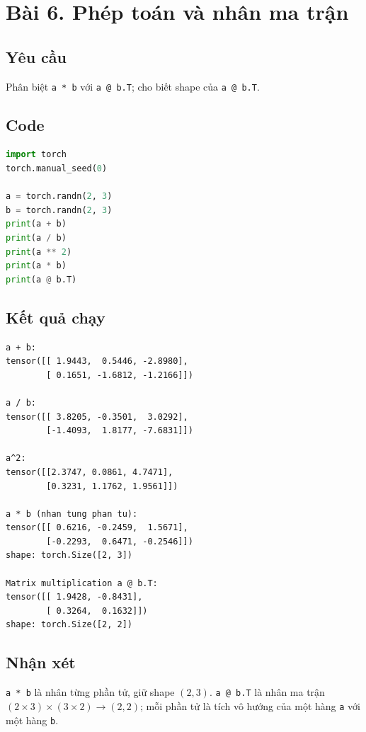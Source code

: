 \documentclass[a4paper,13pt]{article}
\begin{document}
\newpage
\section{Bài 6. Phép toán và nhân ma trận}

\subsection{Yêu cầu}
Phân biệt \texttt{a * b} với \texttt{a @ b.T}; cho biết shape của \texttt{a @ b.T}.

\subsection{Code}
\begin{lstlisting}[language=Python]
import torch
torch.manual_seed(0)

a = torch.randn(2, 3)
b = torch.randn(2, 3)
print(a + b)
print(a / b)
print(a ** 2)
print(a * b)
print(a @ b.T)
\end{lstlisting}

\subsection{Kết quả chạy}
\begin{lstlisting}[backgroundcolor=\color{outgray}]
a + b:
tensor([[ 1.9443,  0.5446, -2.8980],
        [ 0.1651, -1.6812, -1.2166]])

a / b:
tensor([[ 3.8205, -0.3501,  3.0292],
        [-1.4093,  1.8177, -7.6831]])

a^2:
tensor([[2.3747, 0.0861, 4.7471],
        [0.3231, 1.1762, 1.9561]])

a * b (nhan tung phan tu):
tensor([[ 0.6216, -0.2459,  1.5671],
        [-0.2293,  0.6471, -0.2546]])
shape: torch.Size([2, 3])

Matrix multiplication a @ b.T:
tensor([[ 1.9428, -0.8431],
        [ 0.3264,  0.1632]])
shape: torch.Size([2, 2])
\end{lstlisting}

\subsection{Nhận xét}
\texttt{a * b} là nhân từng phần tử, giữ shape $(2,3)$. \texttt{a @ b.T} là nhân ma trận $(2 \times 3) \times (3 \times 2) \to (2,2)$; mỗi phần tử là tích vô hướng của một hàng \texttt{a} với một hàng \texttt{b}.

\newpage
\end{document}

